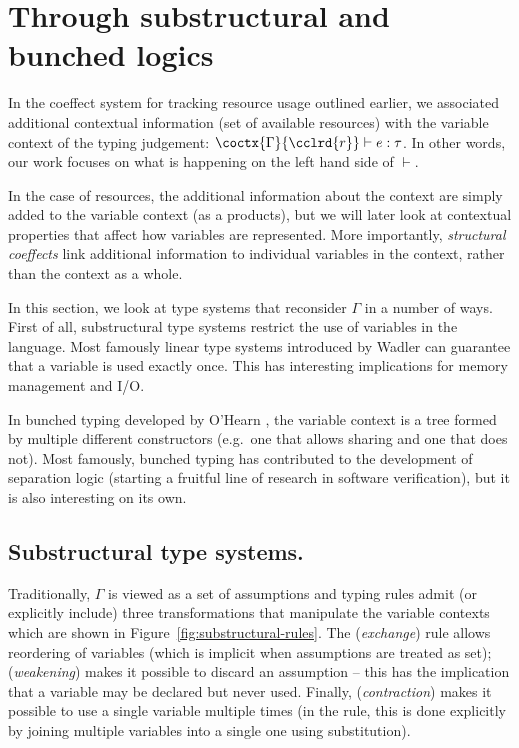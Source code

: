 \section{Through substructural and bunched logics}
\label{sec:path-logic}

In the coeffect system for tracking resource usage outlined earlier, we associated additional
contextual information (set of available resources) with the variable context of the typing
judgement: $\coctx{\Gamma}{\cclrd{r}} \vdash e : \tau$. In other words, our work focuses on
what is happening on the left hand side of $\vdash$.

In the case of resources, the additional information about the context are simply added to the
variable context (as a products), but we will later look at contextual properties that affect
how variables are represented. More importantly, \emph{structural coeffects} link additional
information to individual variables in the context, rather than the context as a whole.

In this section, we look at type systems that reconsider $\Gamma$ in a number of ways.
First of all, substructural type systems \cite{substruct-attpl-intro} restrict the use of variables
in the language. Most famously linear type systems introduced by Wadler \cite{substruct-linear-change}
can guarantee that a variable is used exactly once. This has interesting implications for memory
management and I/O.

In bunched typing developed by O'Hearn \cite{substruct-bunched}, the variable context is a tree
formed by multiple different constructors (e.g.~one that allows sharing and one that does not).
Most famously, bunched typing has contributed to the development of separation logic
\cite{substruct-separation-logic} (starting a fruitful line of research in software verification),
but it is also interesting on its own.


\subsection{Substructural type systems.}

Traditionally, $\Gamma$ is viewed as a set of assumptions and typing rules admit (or explicitly
include) three transformations that manipulate the variable contexts which are shown in
Figure~\ref{fig:substructural-rules}. The (\emph{exchange}) rule allows reordering of variables
(which is implicit when assumptions are treated as set); (\emph{weakening}) makes it possible
to discard an assumption -- this has the implication that a variable may be declared but never
used. Finally, (\emph{contraction}) makes it possible to use a single variable multiple times
(in the rule, this is done explicitly by joining multiple variables into a single one using
substitution).

